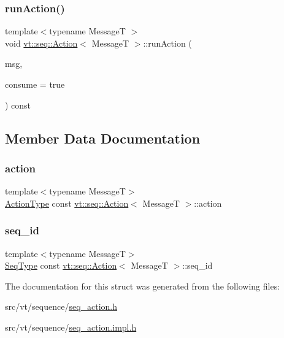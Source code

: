 \subsubsection{\texorpdfstring{run\+Action()}{runAction()}}
{\footnotesize\ttfamily template$<$typename MessageT $>$ \\
void \hyperlink{structvt_1_1seq_1_1_action}{vt\+::seq\+::\+Action}$<$ MessageT $>$\+::run\+Action (\begin{DoxyParamCaption}\item[{\hyperlink{namespacevt_ab2b3d506ec8e8d1540aede826d84a239}{Msg\+Shared\+Ptr}$<$ MessageT $>$}]{msg,  }\item[{bool const}]{consume = {\ttfamily true} }\end{DoxyParamCaption}) const}



\subsection{Member Data Documentation}
\mbox{\label{structvt_1_1seq_1_1_action_aff78400db5a8a2ba0faaa80acb90ec78}} 
\subsubsection{\texorpdfstring{action}{action}}
{\footnotesize\ttfamily template$<$typename MessageT$>$ \\
\hyperlink{structvt_1_1seq_1_1_action_ae38fc2cf91f5654f548ea386ee603963}{Action\+Type} const \hyperlink{structvt_1_1seq_1_1_action}{vt\+::seq\+::\+Action}$<$ MessageT $>$\+::action}

\mbox{\label{structvt_1_1seq_1_1_action_a3c0bb8676960fc1dff403f2a17ac4e3e}} 
\subsubsection{\texorpdfstring{seq\+\_\+id}{seq\_id}}
{\footnotesize\ttfamily template$<$typename MessageT$>$ \\
\hyperlink{namespacevt_1_1seq_a3b612da217ac669d39c159f134ab8434}{Seq\+Type} const \hyperlink{structvt_1_1seq_1_1_action}{vt\+::seq\+::\+Action}$<$ MessageT $>$\+::seq\+\_\+id}



The documentation for this struct was generated from the following files\+:\begin{DoxyCompactItemize}
\item 
src/vt/sequence/\hyperlink{seq__action_8h}{seq\+\_\+action.\+h}\item 
src/vt/sequence/\hyperlink{seq__action_8impl_8h}{seq\+\_\+action.\+impl.\+h}\end{DoxyCompactItemize}
